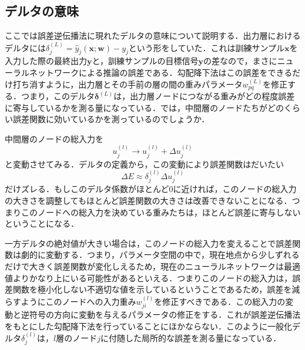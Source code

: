 \documentclass[a4paper,11pt]{jsreport}
\begin{document}
\subsection{デルタの意味}
ここでは誤差逆伝播法に現れたデルタの意味について説明する．出力層におけるデルタには$\delta_j^{(L)}=\hat{y}_j(\bm{x};\bm{w})-y_j$という形をしていた．これは訓練サンプル$\bm{x}$を入力した際の最終出力$\bm{y}$と，訓練サンプルの目標信号$\bm{y}$の差なので，まさにニューラルネットワークによる推論の誤差である．勾配降下法はこの誤差をできるだけ打ち消すように，出力層とその手前の層の間の重みパラメータ$w_{pq}^{(L)}$を修正する．つまり，このデルタ$\bm{\delta}^{(L)}$は，出力層ノードにつながる重みがどの程度誤差に寄与しているかを測る量になっている．では，中間層のノードたちがどのくらい誤差関数に効いているかを測っているのでしょうか．\par
中間層のノードの総入力を
\begin{equation}
  u_j^{(l)} \rightarrow u_j^{(l)} + \Delta u_j^{(l)}
\end{equation}
と変動させてみる．デルタの定義から，この変動により誤差関数はだいたい
\begin{equation}
  \Delta E \approx \delta_j^{(l)} \Delta u_j^{(l)}
\end{equation}
だけズレる．もしこのデルタ係数がほとんど0に近ければ，このノードの総入力の大きさを調整してもほとんど誤差関数の大きさは改善できないことになる．つまりこのノードへの総入力を決めている重みたちは，ほとんど誤差に寄与しないということになる．\par
一方デルタの絶対値が大きい場合は，このノードの総入力を変えることで誤差関数は劇的に変動する．つまり，パラメータ空間の中で，現在地点から少しずれるだけで大きく誤差関数が変化しえるため，現在のニューラルネットワークは最適値よりかなり上にいる可能性があるといえる．つまりこのノードの総入力は，誤差関数を極小化しない不適切な値を示しているということであるため，誤差を減らすようにこのノードへの入力重み$w_{ji}^{(l)}$を修正すべきである．この総入力の変動と逆符号の方向に変動を与えるパラメータの修正をする．これが誤差逆伝播法をもとにした勾配降下法を行っていることにほかならない．このように一般化デルタ$\delta_j^(l)$は，$l$層のノード$j$に付随した局所的な誤差を測る量になっている．
\end{document}
